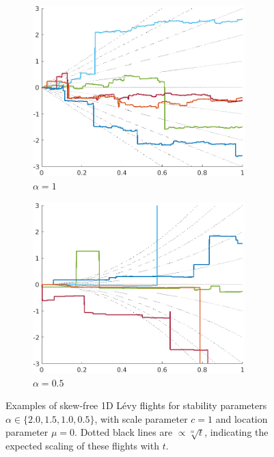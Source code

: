 \begin{itemize}
\begin{figure}[!ht]
\begin{subfigure}{0.5\textwidth}
                \centering
                \includegraphics[width = 0.9\textwidth]{1 - low-noise PiC models/2 - FEM vs PiC coupling/2 - PiC/images/alpha = 1.0.png}
                \caption{$\alpha  =  1$}
            \end{subfigure}%
            \begin{subfigure}{0.5\textwidth}
                \centering
                \includegraphics[width = 0.9\textwidth]{1 - low-noise PiC models/2 - FEM vs PiC coupling/2 - PiC/images/alpha = 0.5.png}
                \caption{$\alpha  =  0.5$}
            \end{subfigure}
            \caption{Examples of skew-free 1D Lévy flights for stability parameters $\alpha  \in  \{2.0, 1.5, 1.0, 0.5\}$, with scale parameter $c  =  1$ and location parameter $\mu  =  0$. Dotted black lines are $\propto  \sqrt[\alpha]{t}$, indicating the expected scaling of these flights with $t$.}
            \label{fig:Levy flight examples}
        \end{figure}


\end{itemize}
